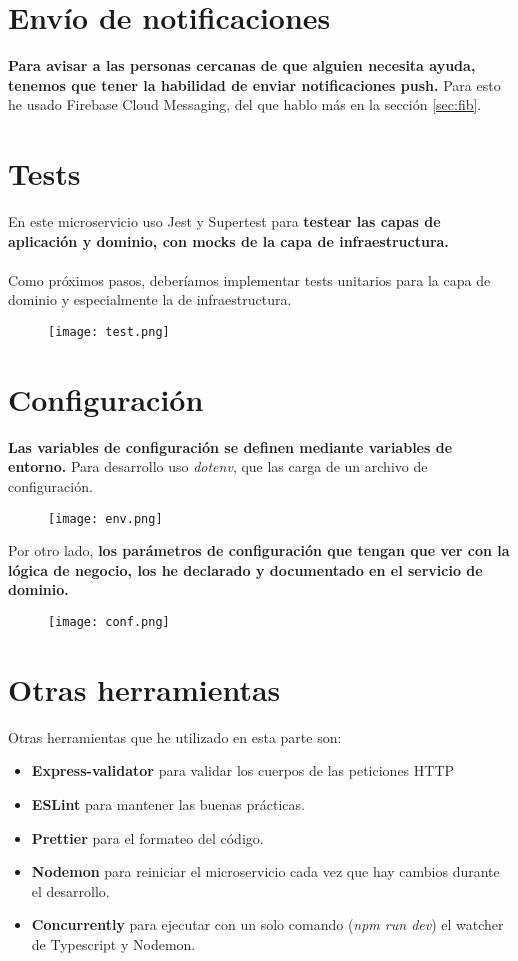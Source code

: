 \section{Envío de notificaciones}\label{sec:fibpre}
\textbf{Para avisar a las personas cercanas de que alguien necesita ayuda, tenemos que tener la habilidad de enviar
notificaciones push.} Para esto he usado Firebase Cloud Messaging, del que hablo más en la sección \ref{sec:fib}.

\section{Tests}\label{sec:tests}
En este microservicio uso Jest y Supertest \cite{supertest} para \textbf{testear las capas de aplicación y dominio, con mocks de la capa de infraestructura.} \\ \\
Como próximos pasos, deberíamos implementar tests unitarios para la capa de dominio y especialmente la de infraestructura.
\begin{figure}[H]
	\centering	
	\texttt{[image: test.png]}
	\end{figure}

\section{Configuración}\label{sec:config}
\textbf{Las variables de configuración se definen mediante variables de entorno.} Para desarrollo uso \textit{dotenv}, 
que las carga de un archivo de configuración.
\begin{figure}[H]
	\centering	
	\texttt{[image: env.png]}
	\end{figure}

	Por otro lado, \textbf{los parámetros de configuración que tengan que ver con la lógica
	de negocio, los he declarado y documentado en el servicio de dominio.}

\begin{figure}[H]
	\centering	
	\texttt{[image: conf.png]}
	\end{figure}



\section{Otras herramientas}\label{sec:tools}
Otras herramientas que he utilizado en esta parte son:
\begin{itemize}
	\item \textbf{Express-validator} para validar los cuerpos de las peticiones HTTP
	\item \textbf{ESLint} para mantener las buenas prácticas.
	\item \textbf{Prettier} para el formateo del código.
	\item \textbf{Nodemon} para reiniciar el microservicio cada vez que hay cambios durante el desarrollo.
	\item \textbf{Concurrently} para ejecutar con un solo comando (\textit{npm run dev}) el watcher de Typescript y Nodemon.
\end{itemize}